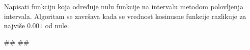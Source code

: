 \begin{Answer}[ref=405]
\end{Answer}
\begin{Exercise}[label=406]
  Napisati funkciju koja određuje nulu funkcije  na
  intervalu \argf{[0,2]} metodom polovljenja intervala. Algoritam se
  završava kada se vrednost kosinusne funkcije razlikuje za najviše
  $0.001$ od nule. 
  
\begin{minitest}
\begin{test}{1}
#\naslovIzlaz#
##
\end{test}
\end{minitest}


\end{Exercise}

